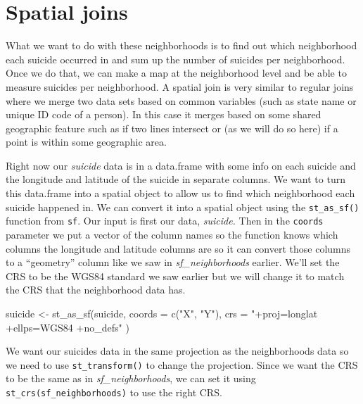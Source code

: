 \documentclass[
]{krantz}
\makeatletter
\newenvironment{Shaded}{\begin{snugshade}}{\end{snugshade}}
\newcommand{\AttributeTok}[1]{\textcolor[rgb]{0.61,0.61,0.61}{#1}}
\newcommand{\FunctionTok}[1]{\textcolor[rgb]{0,0,0}{#1}}
\newcommand{\NormalTok}[1]{#1}
\newcommand{\OtherTok}[1]{\textcolor[rgb]{0.37,0.37,0.37}{#1}}
\newcommand{\StringTok}[1]{\textcolor[rgb]{0.5,0.5,0.5}{#1}}
\newenvironment{kframe}{%
\medskip{}
\setlength{\fboxsep}{.8em}
 \def\at@end@of@kframe{}%
 \ifinner\ifhmode%
  \def\at@end@of@kframe{\end{minipage}}%
  \begin{minipage}{\columnwidth}%
 \fi\fi%
 \def\FrameCommand##1{\hskip\@totalleftmargin \hskip-\fboxsep
 \colorbox{shadecolor}{##1}\hskip-\fboxsep
     \hskip-\linewidth \hskip-\@totalleftmargin \hskip\columnwidth}%
 \MakeFramed {\advance\hsize-\width
   \@totalleftmargin\z@ \linewidth\hsize
   \@setminipage}}%
 {\par\unskip\endMakeFramed%
 \at@end@of@kframe}
\renewenvironment{Shaded}{\begin{kframe}}{\end{kframe}}
\makeatother
\begin{document}
\hypertarget{spatial-joins}{%
\section{Spatial joins}\label{spatial-joins}}

What we want to do with these neighborhoods is to find out
which neighborhood each suicide occurred in and sum up the
number of suicides per neighborhood. Once we do that, we can
make a map at the neighborhood level and be able to measure
suicides per neighborhood. A spatial join is very similar to
regular joins where we merge two data sets based on common
variables (such as state name or unique ID code of a
person). In this case it merges based on some shared
geographic feature such as if two lines intersect or (as we
will do so here) if a point is within some geographic area.

Right now our \emph{suicide} data is in a data.frame with
some info on each suicide and the longitude and latitude of
the suicide in separate columns. We want to turn this
data.frame into a spatial object to allow us to find which
neighborhood each suicide happened in. We can convert it
into a spatial object using the \texttt{st\_as\_sf()}
function from \texttt{sf}. Our input is first our data,
\emph{suicide.} Then in the \texttt{coords} parameter we put
a vector of the column names so the function knows which
columns the longitude and latitude columns are so it can
convert those columns to a ``geometry'' column like we saw
in \emph{sf\_neighborhoods} earlier. We'll set the CRS to be
the WGS84 standard we saw earlier but we will change it to
match the CRS that the neighborhood data has.

\begin{Shaded}
\begin{Highlighting}[]
\NormalTok{suicide }\OtherTok{\textless{}{-}} \FunctionTok{st\_as\_sf}\NormalTok{(suicide,}
  \AttributeTok{coords =} \FunctionTok{c}\NormalTok{(}\StringTok{"X"}\NormalTok{, }\StringTok{"Y"}\NormalTok{),}
  \AttributeTok{crs =} \StringTok{"+proj=longlat +ellps=WGS84 +no\_defs"}
\NormalTok{)}
\end{Highlighting}
\end{Shaded}

We want our suicides data in the same projection as the
neighborhoods data so we need to use
\texttt{st\_transform()} to change the projection. Since we
want the CRS to be the same as in \emph{sf\_neighborhoods},
we can set it using \texttt{st\_crs(sf\_neighborhoods)} to
use the right CRS.
\end{document}
